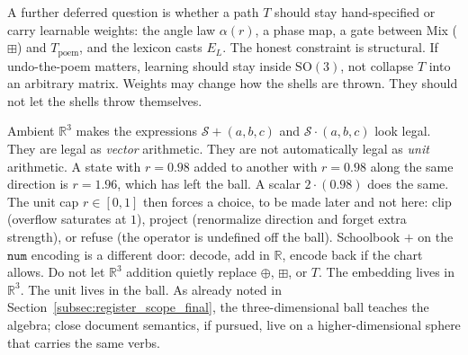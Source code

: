 \documentclass[12pt, a4paper]{article}
\begin{document}
A further deferred question is whether a path $T$ should stay
hand-specified or carry learnable weights: the angle law
$\alpha(r)$, a phase map, a gate between Mix ($\boxplus$) and
$T_{\mathrm{poem}}$, and the lexicon casts $E_L$. The honest
constraint is structural. If undo-the-poem matters, learning should
stay inside $\mathrm{SO}(3)$, not collapse $T$ into an arbitrary
matrix. Weights may change how the shells are thrown. They should
not let the shells throw themselves.

Ambient $\mathbb{R}^3$ makes the expressions
$\mathcal{S}+(a,b,c)$ and $\mathcal{S}\cdot(a,b,c)$ look legal.
They are legal as \emph{vector} arithmetic. They are not automatically
legal as \emph{unit} arithmetic. A state with $r=0.98$ added to
another with $r=0.98$ along the same direction is $r=1.96$, which
has left the ball. A scalar $2\cdot(0.98)$ does the same. The unit
cap $r\in[0,1]$ then forces a choice, to be made later and not
here: clip (overflow saturates at $1$), project (renormalize
direction and forget extra strength), or refuse (the operator is
undefined off the ball). Schoolbook $+$ on the $\mathtt{num}$
encoding is a different door: decode, add in $\mathbb{R}$, encode
back if the chart allows. Do not let $\mathbb{R}^3$ addition
quietly replace $\oplus$, $\boxplus$, or $T$. The embedding
lives in $\mathbb{R}^3$. The unit lives in the ball.
As already noted in Section~\ref{subsec:register_scope_final},
the three-dimensional ball teaches the algebra; close document
semantics, if pursued, live on a higher-dimensional sphere that
carries the same verbs.
\end{document}
